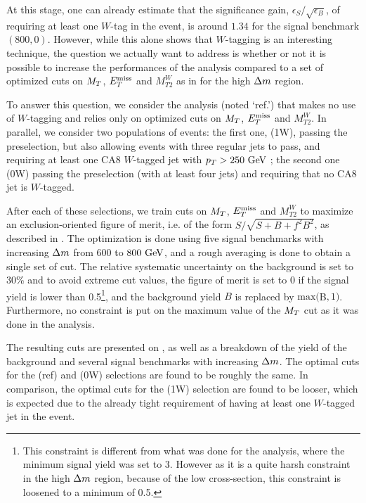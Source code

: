     At this stage, one can already estimate that the significance gain,
    $\epsilon_S / \sqrt{\epsilon_B}$, of requiring at least one $W$-tag in the
    event, is around $1.34$ for the signal benchmark $(800,0)$. However, while
    this alone shows that $W$-tagging is an interesting technique, the question
    we actually want to address is whether or not it is possible to increase the
    performances of the analysis compared to a set of optimized cuts on $M_T$,
    $E_T^\text{miss}$ and $M_{T2}^{W}$ as in  for
    the high $\Delta m$ region.

    To answer this question, we consider the analysis (noted `ref.') that makes
    no use of $W$-tagging and relies only on optimized cuts on $M_T$, $E_T^\text{miss}$ and
    $M_{T2}^{W}$. In parallel, we consider two populations of events: the first
    one, (1W), passing the preselection, but also allowing events with three
    regular jets to pass, and requiring at least one CA8 $W$-tagged jet with
    $p_T > 250~\text{GeV}$ ; the second one (0W) passing the preselection (with at
    least four jets) and requiring that no CA8 jet is $W$-tagged.

    After each of these selections, we train cuts on $M_T$, $E_T^\text{miss}$ and
    $M_{T2}^{W}$ to maximize an exclusion-oriented figure of merit, i.e. of the
    form $S/\sqrt{S+B+f^2 B^2}$, as described in .
    The optimization is done using five signal benchmarks with increasing
    $\Delta m$ from $600$ to $800~\text{GeV}$, and a rough averaging is done to obtain a
    single set of cut.  The relative systematic uncertainty on the background is
    set to 30\% and to avoid extreme cut values, the figure of merit is set to 0
    if the signal yield is lower than 0.5\footnote{This constraint is different
    from what was done for the analysis, where the minimum signal yield was set
    to 3. However as it is a quite harsh constraint in the high $\Delta m$
    region, because of the low cross-section, this constraint is loosened to a
    minimum of 0.5.}, and the background yield $B$ is replaced by
    $\text{max}($B$,1)$. Furthermore, no constraint is put on the maximum value
    of the $M_T$ cut as it was done in the analysis.

    The resulting cuts are presented on , as
    well as a breakdown of the yield of the background and several signal
    benchmarks with increasing $\Delta m$.  The optimal cuts for the (ref) and
    (0W) selections are found to be roughly the same. In comparison, the optimal
    cuts for the (1W) selection are found to be looser, which is expected due to
    the already tight requirement of having at least one $W$-tagged jet in the
    event.

